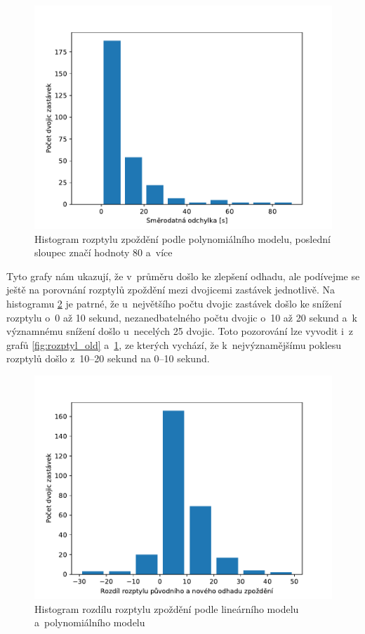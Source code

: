 \begin{figure}
   \centering
 \includegraphics[width=\linewidth]{../img/rozptyl_new}
 \caption{Histogram rozptylu zpoždění podle polynomiálního modelu, poslední sloupec značí hodnoty 80 a~více}
 \label{fig:rozptyl_new}
\end{figure}


\bigbreak

Tyto grafy nám ukazují, že v~průměru došlo ke zlepšení odhadu, ale podívejme se ještě na porovnání rozptylů zpoždění mezi dvojicemi zastávek jednotlivě. Na histogramu \ref{fig:rozptyl_diff} je patrné, že u~největšího počtu dvojic zastávek došlo ke snížení rozptylu o~0 až 10 sekund, nezanedbatelného počtu dvojic o~10 až 20 sekund a~k významnému snížení došlo u~necelých 25 dvojic. Toto pozorování lze vyvodit i~z grafů \ref{fig:rozptyl_old} a~\ref{fig:rozptyl_new}, ze kterých vychází, že k~nejvýznamějšímu poklesu rozptylů došlo z~10--20 sekund na 0--10 sekund.


\begin{figure}
   \centering
 \includegraphics[width=1\linewidth]{../img/rozptyl_diff}
 \caption{Histogram rozdílu rozptylu zpoždění podle lineárního modelu a~polynomiálního modelu}
 \label{fig:rozptyl_diff}
\end{figure}


